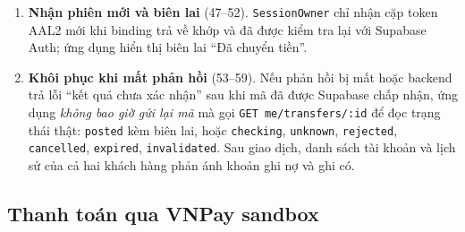 \begin{enumerate}
  \item \textbf{Nhận phiên mới và biên lai} (47--52). \texttt{SessionOwner} chỉ nhận cặp token AAL2 mới khi binding trả về khớp và đã được kiểm tra lại với Supabase Auth; ứng dụng hiển thị biên lai ``Đã chuyển tiền''.
  \item \textbf{Khôi phục khi mất phản hồi} (53--59). Nếu phản hồi bị mất hoặc backend trả lỗi ``kết quả chưa xác nhận'' sau khi mã đã được Supabase chấp nhận, ứng dụng \emph{không bao giờ gửi lại mã} mà gọi \texttt{GET me/\allowbreak{}transfers/\allowbreak{}:id} để đọc trạng thái thật: \texttt{posted} kèm biên lai, hoặc \texttt{checking}, \texttt{unknown}, \texttt{rejected}, \texttt{cancelled}, \texttt{expired}, \texttt{invalidated}. Sau giao dịch, danh sách tài khoản và lịch sử của cả hai khách hàng phản ánh khoản ghi nợ và ghi có.
\end{enumerate}

\subsection{Thanh toán qua VNPay sandbox}
\label{sec:ch2-flow-vnpay}

